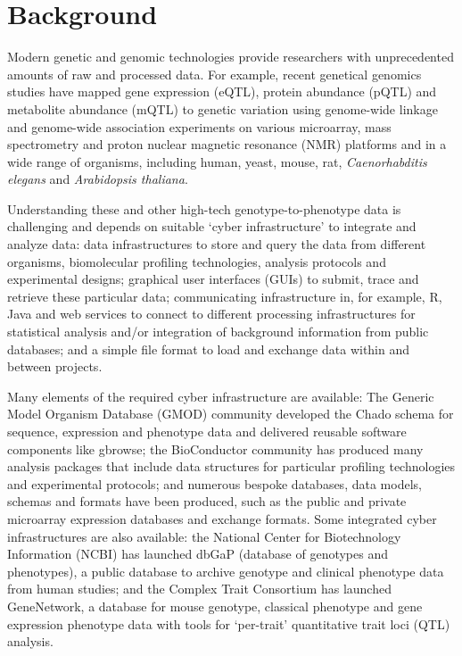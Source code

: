 \section{Background}
Modern genetic and genomic technologies provide researchers with unprecedented amounts of raw and processed data.
For example, recent genetical genomics\cite{Li_2008, Jansen_2001, Li_2005} studies have mapped gene expression (eQTL), protein abundance (pQTL) and metabolite abundance (mQTL) to genetic variation using genome-wide linkage and genome-wide association experiments on various microarray, mass spectrometry and proton nuclear magnetic resonance (NMR) platforms and in a wide range of organisms, including human\cite{Editorial_2007, G_ring_2007, Dixon_2007, Stranger_2007a, Heap_2009}, yeast\cite{Brem_2002, Foss_2007}, mouse\cite{Bystrykh_2005}, rat\cite{Hubner_2005}, \textsl{Caenorhabditis elegans}\cite{Li_2006} and \textsl{Arabidopsis thaliana}\cite{Keurentjes_2007, Keurentjes_2006, Fu_2009}.

Understanding these and other high-tech genotype-to-phenotype data is challenging and depends on suitable ‘cyber infrastructure’ to integrate and analyze data\cite{Stein_2008, Fay_2008}: data infrastructures to store and query the data from different organisms, biomolecular profiling technologies, analysis protocols and experimental designs; graphical user interfaces (GUIs) to submit, trace and retrieve these particular data; communicating infrastructure in, for example, R\cite{Ihaka_1996}, Java and web services to connect to different processing infrastructures for statistical analysis\cite{Carey_2006, Alberts_2007, Fu_2007, Bhave_2007, Broman_2003} and/or integration of background information from public databases\cite{Smedley_2008}; and a simple file format to load and exchange data within and between projects.

Many elements of the required cyber infrastructure are available: The Generic Model Organism Database (GMOD) community developed the Chado schema for sequence, expression and phenotype data\cite{Mungall_2007} and delivered reusable software components like gbrowse\cite{Stein_2002}; the BioConductor community has produced many analysis packages that include data structures for particular profiling technologies and experimental protocols\cite{Gentleman_2004}; and numerous bespoke databases, data models, schemas and formats have been produced, such as the public and private microarray expression databases and exchange formats\cite{Brazma_2006, Saal_2002, Galperin_2009}.
Some integrated cyber infrastructures are also available: the National Center for Biotechnology Information (NCBI) has launched dbGaP (database of genotypes and phenotypes)\cite{Mailman_2007}, a public database to archive genotype and clinical phenotype data from human studies; and the Complex Trait Consortium has launched GeneNetwork\cite{Chesler_2005}, a database for mouse genotype, classical phenotype and gene expression phenotype data with tools for ‘per-trait’ quantitative trait loci (QTL) analysis.

